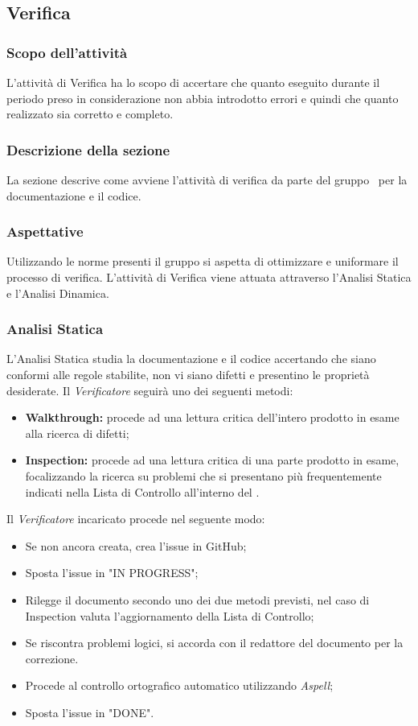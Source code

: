 \subsection{Verifica}\label{Verifica}
\subsubsection{Scopo dell'attività} \label{PSup_Verifica_Scopo}
L'attività di Verifica ha lo scopo di accertare che quanto eseguito durante il periodo preso in considerazione non abbia introdotto errori e quindi che quanto realizzato sia corretto e completo.
\subsubsection{Descrizione della sezione} 
La sezione descrive come avviene l'attività di verifica da parte del gruppo \Gruppo\ per la documentazione e il codice.
\subsubsection{Aspettative}
Utilizzando le norme presenti il gruppo si aspetta di ottimizzare e uniformare il processo di verifica. 
L'attività di Verifica viene attuata attraverso l'Analisi Statica e l'Analisi Dinamica. 
\subsubsection{Analisi Statica}
L'Analisi Statica studia la documentazione e il codice accertando che siano conformi alle regole stabilite, non vi siano difetti e presentino le proprietà desiderate.
Il \textit{Verificatore} seguirà uno dei seguenti metodi:
\begin{itemize}
	\item \textbf{Walkthrough:} procede ad una lettura critica dell'intero prodotto in esame alla ricerca di difetti;
	\item \textbf{Inspection:} procede ad una lettura critica di una parte prodotto in esame, focalizzando la ricerca su problemi che si presentano più frequentemente indicati nella Lista di Controllo all'interno del \PdQv{}.
\end{itemize}

\label{VerificaDocumentazione}
Il \textit{Verificatore} incaricato procede nel seguente modo:
\begin{itemize}
	\item Se non ancora creata, crea l'issue in GitHub;
	\item Sposta l'issue in "IN PROGRESS";
	\item Rilegge il documento secondo uno dei due metodi previsti, nel caso di Inspection valuta l'aggiornamento della Lista di Controllo;
	\item Se riscontra problemi logici, si accorda con il redattore del documento per la correzione. 
	\item Procede al controllo ortografico automatico utilizzando \textit{Aspell};
	\item Sposta l'issue in "DONE".
\end{itemize}


